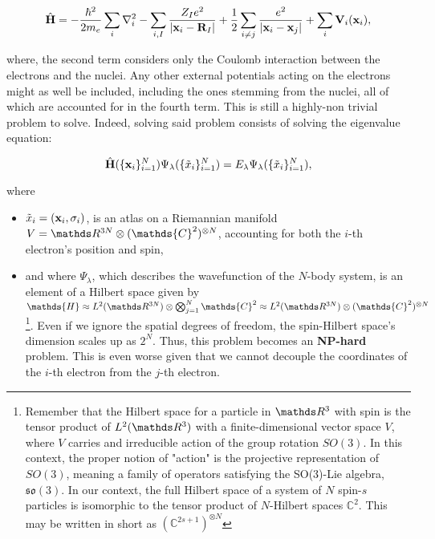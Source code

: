 \documentclass{homework}
\begin{document}
\begin{equation}
    \hat{\bf H} = -\frac{\hbar^2}{2m_e} \sum_i \nabla^2_i - \sum_{i, I} \frac{Z_I e^2}{|{\bf x}_i - {\bf R}_I|} + \frac{1}{2} \sum_{i \neq j} \frac{e^2}{|{\bf x}_i-{\bf x}_j|} + \sum_{i} {\bf V}_i ({\bf x}_i),
\label{simplified many-body Hamiltonian}
\end{equation}

where, the second term considers only the Coulomb interaction between the electrons and the nuclei. Any other external potentials acting on the electrons might as well be included, including the ones stemming from the nuclei, all of which are accounted for in the fourth term. 
This is still a highly-non trivial problem to solve. Indeed, solving said problem consists of solving the eigenvalue equation:

\begin{equation}
\hat{\bf H}(\{{\bf x}_i\}_{i=1}^{N}) \Psi_\lambda(\{{\tilde x}_i\}_{i=1}^{N}) = E_\lambda \Psi_\lambda(\{{\tilde x}_i\}_{i=1}^{N}),
\label{ev equation}
\end{equation}

where 

\begin{itemize}
    \item $\tilde{x}_i = ({\bf x}_i, \sigma_i)$, is an atlas on a Riemannian manifold $V = \R^{3N} \otimes (\mathds{C}^2)^{\otimes N}$, accounting for both the $i$-th electron's position and spin,
    \item and where $\Psi_\lambda$, which describes the wavefunction of the $N$-body system, is an element of a Hilbert space given by $\mathds{H} \approx L^2(\R^{3N}) \otimes \bigotimes_{j=1}^{N} \mathds{C}^2 \approx L^2(\R^{3N}) \otimes (\mathds{C}^{2})^{\otimes N}$\footnote{Remember that the Hilbert space for a particle in $\R^3$ with spin is the tensor product of $L^2(\R^3)$ with a finite-dimensional vector space $V$, where $V$ carries and irreducible action of the group rotation $SO(3)$. In this context, the proper notion of "action" is the projective representation of $SO(3)$, meaning a family of operators satisfying the SO(3)-Lie algebra, $\mathfrak{so}(3)$. In our context, the full Hilbert space of a system of $N$ spin-$s$ particles is isomorphic to the tensor product of $N$-Hilbert spaces $\mathds{C}^2$. This may be written in short as $(\mathds{C}^{2s+1})^{\otimes N}$}. Even if we ignore the spatial degrees of freedom, the spin-Hilbert space's dimension scales up as $2^N$. Thus, this problem becomes an \textbf{NP-hard} problem. This is even worse given that we cannot decouple the coordinates of the $i$-th electron from the $j$-th electron. \\ 
\end{itemize}
\end{document}
